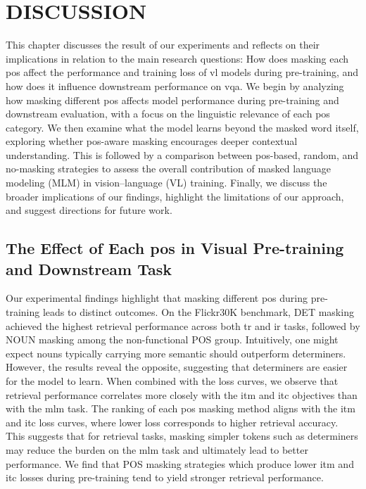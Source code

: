 \chapter{DISCUSSION}
This chapter discusses the result of our experiments and reflects on their implications in relation to the main research questions: How does masking each \acrshort{pos} affect the performance and training loss of \acrshort{vl} models during pre-training, and how does it influence downstream performance on \acrfull{vqa}.
We begin by analyzing how masking different \acrshort{pos} affects model performance during pre-training and downstream evaluation, with a focus on the linguistic relevance of each \acrshort{pos} category.
We then examine what the model learns beyond the masked word itself, exploring whether \acrshort{pos}-aware masking encourages deeper contextual understanding.
This is followed by a comparison between \acrshort{pos}-based, random, and no-masking strategies to assess the overall contribution of masked language modeling (MLM) in vision–language (VL) training.
Finally, we discuss the broader implications of our findings, highlight the limitations of our approach, and suggest directions for future work.

\section{The Effect of Each \acrshort{pos} in Visual Pre-training and Downstream Task}
Our experimental findings highlight that masking different \acrshort{pos} during pre-training leads to distinct outcomes.
On the Flickr30K benchmark, DET masking achieved the highest retrieval performance across both \acrshort{tr} and \acrshort{ir} tasks, followed by NOUN masking among the non-functional POS group.
Intuitively, one might expect nouns typically carrying more semantic should outperform determiners.
However, the results reveal the opposite, suggesting that determiners are easier for the model to learn.
When combined with the loss curves, we observe that retrieval performance correlates more closely with the \acrshort{itm} and \acrshort{itc} objectives than with the \acrshort{mlm} task.
The ranking of each \acrshort{pos} masking method aligns with the \acrshort{itm} and \acrshort{itc} loss curves, where lower loss corresponds to higher retrieval accuracy.
This suggests that for retrieval tasks, masking simpler tokens such as determiners may reduce the burden on the \acrshort{mlm} task and ultimately lead to better performance.
We find that POS masking strategies which produce lower \acrshort{itm} and \acrshort{itc} losses during pre-training tend to yield stronger retrieval performance.

